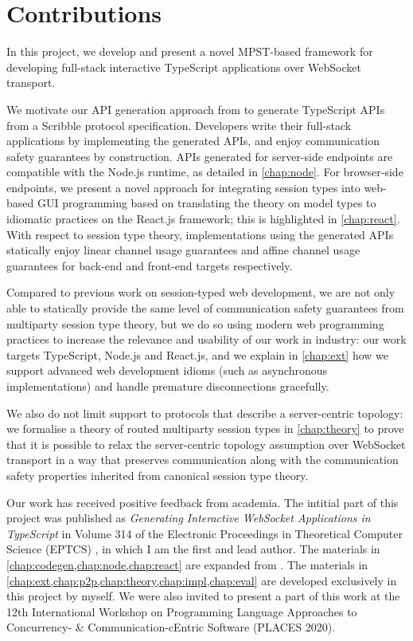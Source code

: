 \section{Contributions}

In this project, we develop and present a novel
MPST-based framework for developing full-stack
interactive TypeScript applications over WebSocket transport.

We motivate our API generation approach from 
\cite{Hybrid2016,PureScript2019} to generate TypeScript APIs
from a Scribble protocol specification.
Developers write their full-stack applications
by implementing the generated APIs, and enjoy 
communication safety guarantees by construction.
APIs generated for server-side endpoints
are compatible with the Node.js runtime,
as detailed in \cref{chap:node}.
For browser-side endpoints,
we present a novel approach for integrating
session types into web-based GUI programming based on
translating the theory on model types \cite{MVU2020}
to idiomatic practices on the React.js framework;
this is highlighted in \cref{chap:react}.
With respect to session type theory, implementations using
the generated APIs statically enjoy linear channel usage
guarantees and affine channel usage guarantees for back-end
and front-end targets respectively.

Compared to previous work 
\cite{Exceptional,PureScript2019,MVU2020,LINKS} on
session-typed web development, 
we are not only able to
statically provide the same level of communication safety
guarantees from multiparty session type theory, but we do so
using modern web programming practices to increase
the relevance and usability of our work in industry:
our work targets TypeScript, Node.js and React.js,
and we explain in \cref{chap:ext} how we support advanced
web development idioms (such as asynchronous implementations)
and handle premature disconnections gracefully.

We also do not limit support to protocols that describe
a server-centric topology: we formalise 
a theory of routed multiparty session types in 
\cref{chap:theory} to prove that it is possible to relax the
server-centric topology assumption over WebSocket transport in a way 
that preserves communication along with the communication safety 
properties inherited from canonical session type theory.

Our work has received positive feedback from academia.
The intitial part of this project was published as 
\emph{Generating Interactive WebSocket 
Applications in TypeScript} in Volume 314 of the Electronic Proceedings
in Theoretical Computer Science (EPTCS) \cite{PLACES2020},
in which I am the first and lead author.
The materials in \cref{chap:codegen,chap:node,chap:react}
are expanded from \cite{PLACES2020}.
The materials in 
\cref{chap:ext,chap:p2p,chap:theory,chap:impl,chap:eval}
are developed exclusively in this project by myself.
We were also invited to present a part of this work
at the 12th International Workshop on
Programming Language Approaches to Concurrency- \& 
Communication-cEntric Software (PLACES 2020).

